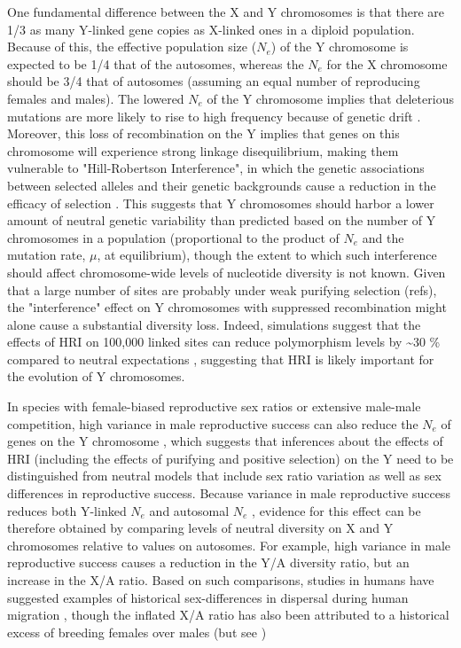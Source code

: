\documentclass[9pt,twocolumn,twoside]{gsajnl}
\begin{document}
One fundamental difference between the X and Y chromosomes is that there are 1/3 as many Y-linked gene copies as X-linked ones in a diploid population. Because of this, the effective population size ($N_{e}$) of the Y chromosome is expected to be 1/4 that of the autosomes, whereas the $N_{e}$ for the X chromosome should be 3/4 that of autosomes (assuming an equal number of reproducing females and males). The lowered $N_{e}$ of the Y chromosome implies that  deleterious mutations are more likely to rise to high frequency because of genetic drift \citep{nei1981genetic}. Moreover, this loss of recombination on the Y implies that genes on this chromosome will experience strong linkage disequilibrium, making them vulnerable to "Hill-Robertson Interference", in which the genetic associations between selected alleles and their genetic backgrounds cause a reduction in the efficacy of selection \citep{fisher1930genetical, muller1964relation, hill1966HReffect, mcvean2000}. This suggests that Y chromosomes should harbor a lower amount of neutral genetic variability than predicted based on the number of Y chromosomes in a population (proportional to the product of $N_{e}$ and the mutation rate, $\mu$, at equilibrium), though the extent to which such interference should affect chromosome-wide levels of nucleotide diversity is not known. Given that a large number of sites are probably under weak purifying selection (\X refs), the "interference" effect on Y chromosomes with suppressed recombination might alone cause a substantial diversity loss. Indeed, simulations suggest that the effects of HRI on 100,000 linked sites can reduce polymorphism levels by \textasciitilde 30 \% compared to neutral expectations \citep{mcvean2000}, suggesting that HRI is likely important for the evolution of Y chromosomes.

In species with female-biased reproductive sex ratios or extensive male-male competition, high variance in male reproductive success can also reduce the $N_{e}$ of genes on the Y chromosome \citep{caballero1995,charlesworth2001,laporte2002,pool2007,ellegren2009}, which suggests that inferences about the effects of HRI (including the effects of purifying and positive selection) on the Y need to be distinguished from neutral models that include sex ratio variation as well as sex differences in reproductive success. Because variance in male reproductive success reduces both Y-linked $N_{e}$ and autosomal $N_{e}$ \citep{kimura1964number,nomura2002effective}, evidence for this effect can be therefore obtained by comparing levels of neutral diversity on X and Y chromosomes relative to values on autosomes. For example, high variance in male reproductive success causes a reduction in the Y/A diversity ratio, but an increase in the X/A ratio. Based on such comparisons, studies in humans have suggested examples of historical sex-differences in dispersal during human migration \citep{wilkins2006unraveling}, though the inflated X/A ratio has also been attributed to a historical excess of breeding females over males \citep{hammer2008sex} (but see \citep{bustamante2009,hammer2010,cotter2016genetic})
\end{document}
